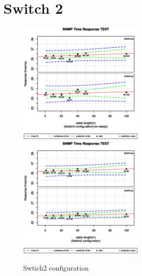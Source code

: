 \documentclass[11pt
  , a4paper
  , article
  , oneside
]{memoir}
\begin{document}
\section{Switch 2}
 \begin{figure}[!htb]
  \centering
  \includegraphics[width=0.55\textwidth]{./images/s2sx.eps}
  \includegraphics[width=0.55\textwidth]{./images/s2s1.eps}
  \caption{Swtich2 configuration}
\end{figure}
\clearpage
\end{document}
